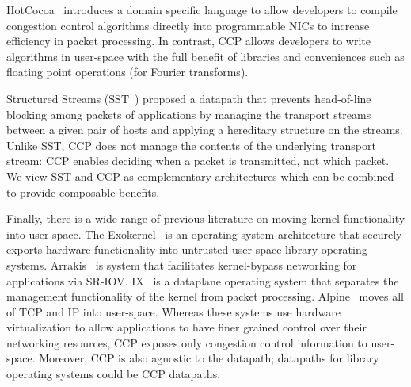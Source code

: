 HotCocoa~\cite{hotcocoa} introduces a domain specific language to allow developers to compile congestion control algorithms directly into programmable NICs to increase efficiency in packet processing. In contrast, CCP allows developers to write algorithms in user-space with the full benefit of libraries and conveniences such as  floating point operations (\eg for Fourier transforms). 

Structured Streams (SST~\cite{structuredstreams}) proposed a datapath that prevents head-of-line blocking among packets of applications by managing the transport streams between a given pair of hosts and applying a hereditary structure on the streams. %
Unlike SST, CCP does not manage the contents of the underlying transport stream: CCP enables deciding when a packet is transmitted, not which packet.
%
We view SST and CCP as complementary architectures which can be combined to provide composable benefits.
%

Finally, there is a wide range of previous literature on moving kernel functionality into user-space. 
The Exokernel~\cite{exokernel} is an operating system architecture that securely exports hardware functionality into untrusted user-space library operating systems.
Arrakis~\cite{arrakis2014} is system that facilitates kernel-bypass networking for applications via SR-IOV. 
IX~\cite{ix} is a dataplane operating system that separates the management functionality of the kernel from packet processing. 
Alpine~\cite{alpine} moves all of TCP and IP into user-space.
Whereas these systems use hardware virtualization to allow applications to have finer grained control over their networking resources,
CCP exposes only congestion control information to user-space. 
Moreover, CCP is also agnostic to the datapath; datapaths for library operating systems could be CCP datapaths.
